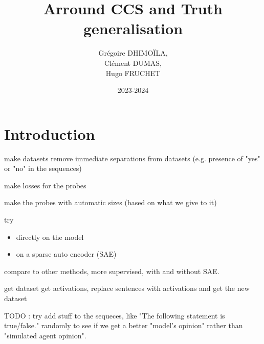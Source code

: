 \documentclass[12pt]{article}
\title{Arround CCS and Truth generalisation}
\author{Grégoire DHIMOÏLA,\\
        Clément DUMAS,\\
        Hugo FRUCHET
}
\date{2023-2024}
\begin{document}
\maketitle

\section{Introduction}

make datasets
remove immediate separations from datasets (e.g. presence of "yes" or "no" in the sequences)

make losses for the probes

make the probes with automatic sizes (based on what we give to it)

try \begin{itemize}
    \item directly on the model
    \item on a sparse auto encoder (SAE)
\end{itemize}

compare to other methods, more supervised, with and without SAE.

get dataset
get activations, replace sentences with activations and get the new dataset

TODO : try add stuff to the sequeces, like "The following statement is true/false." randomly to see if we get a better "model's opinion" rather than "simulated agent opinion".
\end{document}

